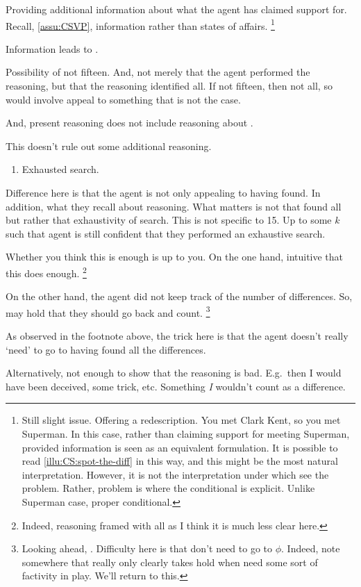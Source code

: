 \begin{note}
    Providing additional information about what the agent has claimed support for.
  Recall, \autoref{assu:CSVP}, information rather than states of affairs.
  \nolinebreak
  \footnote{
    Still slight issue.
    Offering a redescription.
    You met Clark Kent, so you met Superman.
    In this case, rather than claiming support for meeting Superman, provided information is seen as an equivalent formulation.
    It is possible to read \autoref{illu:CS:spot-the-diff} in this way, and this might be the most natural interpretation.
    However, it is not the interpretation under which see the problem.
    Rather, problem is where the conditional is explicit.
    Unlike Superman case, proper conditional.
  }
\end{note}

\begin{note}
  Information leads to \requ{}.

  Possibility of not fifteen.
  And, not merely that the agent performed the reasoning, but that the reasoning identified all.
  If not fifteen, then not all, so would involve appeal to something that is not the case.

  And, present reasoning does not include reasoning about \requ{}.
\end{note}

\begin{note}
  This doesn't rule out some additional reasoning.
  \begin{enumerate}
  \item Exhausted search.
  \end{enumerate}
  Difference here is that the agent is not only appealing to having found.
  In addition, what they recall about reasoning.
  What matters is not that found all but rather that exhaustivity of search.
  This is not specific to 15.
  Up to some \(k\) such that agent is still confident that they performed an exhaustive search.

  Whether you think this is enough is up to you.
  On the one hand, intuitive that this does enough.\nolinebreak
  \footnote{
    Indeed, reasoning framed with all as I think it is much less clear here.
  }

  On the other hand, the agent did not keep track of the number of differences.
  So, may hold that they should go back and count.\nolinebreak
  \footnote{
    Looking ahead, \nI{}.
    Difficulty here is that don't need to go to \(\phi\).
    Indeed, note somewhere that \nI{} really only clearly takes hold when need some sort of factivity in play.
    We'll return to this.
  }

  {
    \color{red} As observed in the footnote above, the trick here is that the agent doesn't really `need' to go to having found all the differences.

    Alternatively, not enough to show that the reasoning is bad.
    E.g.\ then I would have been deceived, some trick, etc.
    Something \emph{I} wouldn't count as a difference.
  }
\end{note}


